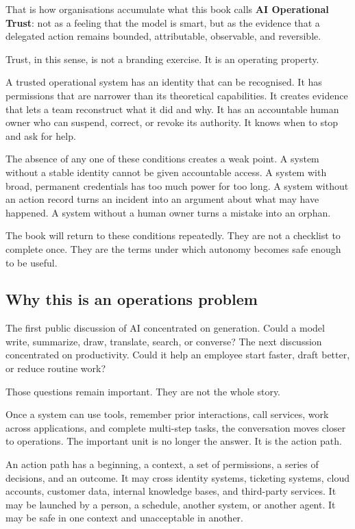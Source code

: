 That is how organisations accumulate what this book calls \textbf{AI
Operational Trust}: not as a feeling that the model is smart, but as the
evidence that a delegated action remains bounded, attributable,
observable, and reversible.

Trust, in this sense, is not a branding exercise. It is an operating
property.

A trusted operational system has an identity that can be recognised. It
has permissions that are narrower than its theoretical capabilities. It
creates evidence that lets a team reconstruct what it did and why. It
has an accountable human owner who can suspend, correct, or revoke its
authority. It knows when to stop and ask for help.

The absence of any one of these conditions creates a weak point. A
system without a stable identity cannot be given accountable access. A
system with broad, permanent credentials has too much power for too
long. A system without an action record turns an incident into an
argument about what may have happened. A system without a human owner
turns a mistake into an orphan.

The book will return to these conditions repeatedly. They are not a
checklist to complete once. They are the terms under which autonomy
becomes safe enough to be useful.

\subsection{Why this is an operations
problem}\label{why-this-is-an-operations-problem}

The first public discussion of AI concentrated on generation. Could a
model write, summarize, draw, translate, search, or converse? The next
discussion concentrated on productivity. Could it help an employee start
faster, draft better, or reduce routine work?

Those questions remain important. They are not the whole story.

Once a system can use tools, remember prior interactions, call services,
work across applications, and complete multi-step tasks, the
conversation moves closer to operations. The important unit is no longer
the answer. It is the action path.

An action path has a beginning, a context, a set of permissions, a
series of decisions, and an outcome. It may cross identity systems,
ticketing systems, cloud accounts, customer data, internal knowledge
bases, and third-party services. It may be launched by a person, a
schedule, another system, or another agent. It may be safe in one
context and unacceptable in another.

